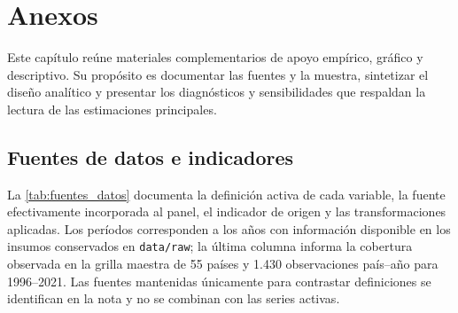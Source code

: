 \documentclass[../../TFM.tex]{subfiles}
\begin{document}
	\appendix
	\chapter{Anexos}
	\label{chap:anexos}

	Este capítulo reúne materiales complementarios de apoyo empírico, gráfico y
	descriptivo. Su propósito es documentar las fuentes y la muestra, sintetizar
	el diseño analítico y presentar los diagnósticos y sensibilidades que respaldan
	la lectura de las estimaciones principales.

	\section{Fuentes de datos e indicadores}
	\label{sec:fuentes}

	La \autoref{tab:fuentes_datos} documenta la definición activa de cada variable, la fuente efectivamente incorporada al panel, el indicador de origen y las transformaciones aplicadas. Los períodos corresponden a los años con información disponible en los insumos conservados en \texttt{data/raw}; la última columna informa la cobertura observada en la grilla maestra de 55 países y 1.430 observaciones país--año para 1996--2021. Las fuentes mantenidas únicamente para contrastar definiciones se identifican en la nota y no se combinan con las series activas.

	\renewcommand{\arraystretch}{1.10}
	\setlength{\tabcolsep}{3pt}
\end{document}
